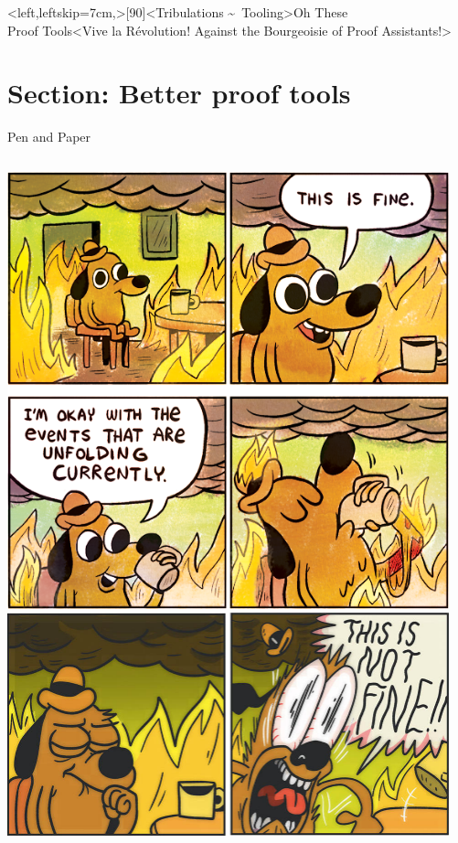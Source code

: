 \interlude*<left,leftskip=7cm,>[90]<Tribulations \textasciitilde\ Tooling>{Oh These\\Proof Tools}<Vive la Révolution! Against the Bourgeoisie of Proof Assistants!>
\section{Section: Better proof tools}

\begin{frame}{Pen and Paper}
  \begin{columns}[c]
    \begin{column}{.35\linewidth}
      \includegraphics[width=\linewidth]{graphics/this-is-fine-crop.png}\\
      \includegraphics[width=\linewidth]{graphics/this-is-not-fine-crop.jpg}%
    \end{column}
    \hspace{1.2em}
    \begin{column}{.68\linewidth}
      \small


\end{column}
\end{columns}
\end{frame}
